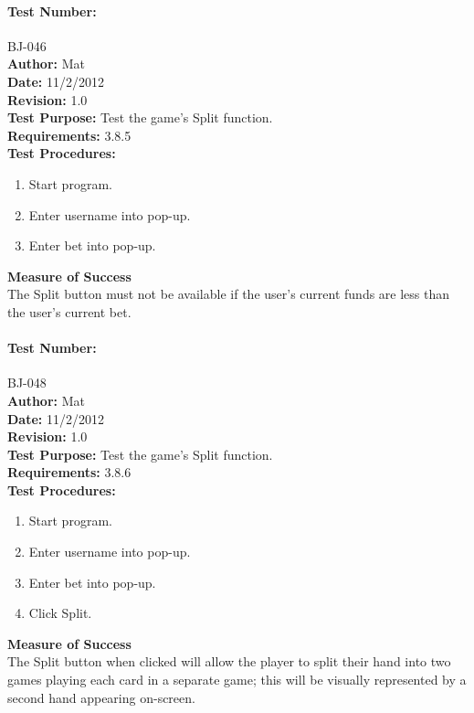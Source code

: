 \documentclass{article}
\begin{document}
\paragraph{Test Number:} BJ-046\\
\textbf{Author:} Mat\\
\textbf{Date:} 11/2/2012\\
\textbf{Revision:} 1.0\\
\textbf{Test Purpose:} Test the game's Split function.\\
\textbf{Requirements:} 3.8.5 \\
\textbf{Test Procedures:} 
\begin{enumerate}
\item Start program.
\item Enter username into pop-up.
\item Enter bet into pop-up.
\end{enumerate}
\textbf{Measure of Success}\\The Split button must not be available if the user's current funds are less than the user's current bet.
\paragraph{Test Number:} BJ-048\\
\textbf{Author:} Mat\\
\textbf{Date:} 11/2/2012\\
\textbf{Revision:} 1.0\\
\textbf{Test Purpose:} Test the game's Split function.\\
\textbf{Requirements:} 3.8.6 \\
\textbf{Test Procedures:} 
\begin{enumerate}
\item Start program.
\item Enter username into pop-up.
\item Enter bet into pop-up.
\item Click Split.
\end{enumerate}
\textbf{Measure of Success}\\The Split button when clicked will allow the player to split their hand into two games playing each card in a separate game; this will be visually represented by a second hand appearing on-screen.
\end{document}
